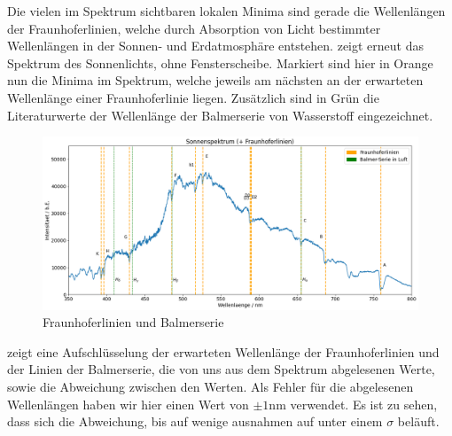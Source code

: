 Die vielen im Spektrum sichtbaren lokalen Minima sind gerade die Wellenlängen der Fraunhoferlinien, welche durch Absorption von Licht bestimmter Wellenlängen in der Sonnen- und Erdatmosphäre entstehen.  zeigt erneut das Spektrum des Sonnenlichts, ohne Fensterscheibe. Markiert sind hier in Orange nun die Minima im Spektrum, welche jeweils am nächsten an der erwarteten Wellenlänge einer Fraunhoferlinie liegen. Zusätzlich sind in Grün die Literaturwerte der Wellenlänge der Balmerserie von Wasserstoff eingezeichnet.

\begin{figure}[H]
  \centering
  \includegraphics[width=\textwidth]{files/plots/spektrum_fraunhofer_balmer.png}
  \caption{Fraunhoferlinien und Balmerserie}
  \label{fig:spektrum_fraunhofer_balmer}
\end{figure}

 zeigt eine Aufschlüsselung der erwarteten Wellenlänge der Fraunhoferlinien und der Linien der Balmerserie, die von uns aus dem Spektrum abgelesenen Werte, sowie die Abweichung zwischen den Werten. Als Fehler für die abgelesenen Wellenlängen haben wir hier einen Wert von $\pm 1 \si{\nano\meter}$ verwendet. Es ist zu sehen, dass sich die Abweichung, bis auf wenige ausnahmen auf unter einem $\sigma$ beläuft.

